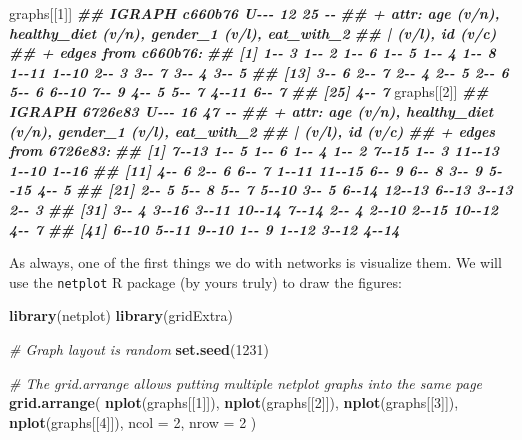 \documentclass[
]{book}
\newenvironment{Shaded}{\begin{snugshade}}{\end{snugshade}}
\newcommand{\AttributeTok}[1]{\textcolor[rgb]{0.13,0.29,0.53}{#1}}
\newcommand{\CommentTok}[1]{\textcolor[rgb]{0.56,0.35,0.01}{\textit{#1}}}
\newcommand{\DecValTok}[1]{\textcolor[rgb]{0.00,0.00,0.81}{#1}}
\newcommand{\DocumentationTok}[1]{\textcolor[rgb]{0.56,0.35,0.01}{\textbf{\textit{#1}}}}
\newcommand{\FunctionTok}[1]{\textcolor[rgb]{0.13,0.29,0.53}{\textbf{#1}}}
\newcommand{\NormalTok}[1]{#1}
\begin{document}
\begin{Shaded}
\begin{Highlighting}[]
\NormalTok{graphs[[}\DecValTok{1}\NormalTok{]]}
\DocumentationTok{\#\# IGRAPH c660b76 U{-}{-}{-} 12 25 {-}{-} }
\DocumentationTok{\#\# + attr: age (v/n), healthy\_diet (v/n), gender\_1 (v/l), eat\_with\_2}
\DocumentationTok{\#\# | (v/l), id (v/c)}
\DocumentationTok{\#\# + edges from c660b76:}
\DocumentationTok{\#\#  [1] 1{-}{-} 3 1{-}{-} 2 1{-}{-} 6 1{-}{-} 5 1{-}{-} 4 1{-}{-} 8 1{-}{-}11 1{-}{-}10 2{-}{-} 3 3{-}{-} 7 3{-}{-} 4 3{-}{-} 5}
\DocumentationTok{\#\# [13] 3{-}{-} 6 2{-}{-} 7 2{-}{-} 4 2{-}{-} 5 2{-}{-} 6 5{-}{-} 6 6{-}{-}10 7{-}{-} 9 4{-}{-} 5 5{-}{-} 7 4{-}{-}11 6{-}{-} 7}
\DocumentationTok{\#\# [25] 4{-}{-} 7}
\NormalTok{graphs[[}\DecValTok{2}\NormalTok{]]}
\DocumentationTok{\#\# IGRAPH 6726e83 U{-}{-}{-} 16 47 {-}{-} }
\DocumentationTok{\#\# + attr: age (v/n), healthy\_diet (v/n), gender\_1 (v/l), eat\_with\_2}
\DocumentationTok{\#\# | (v/l), id (v/c)}
\DocumentationTok{\#\# + edges from 6726e83:}
\DocumentationTok{\#\#  [1]  7{-}{-}13  1{-}{-} 5  1{-}{-} 6  1{-}{-} 4  1{-}{-} 2  7{-}{-}15  1{-}{-} 3 11{-}{-}13  1{-}{-}10  1{-}{-}16}
\DocumentationTok{\#\# [11]  4{-}{-} 6  2{-}{-} 6  6{-}{-} 7  1{-}{-}11 11{-}{-}15  6{-}{-} 9  6{-}{-} 8  3{-}{-} 9  5{-}{-}15  4{-}{-} 5}
\DocumentationTok{\#\# [21]  2{-}{-} 5  5{-}{-} 8  5{-}{-} 7  5{-}{-}10  3{-}{-} 5  6{-}{-}14 12{-}{-}13  6{-}{-}13  3{-}{-}13  2{-}{-} 3}
\DocumentationTok{\#\# [31]  3{-}{-} 4  3{-}{-}16  3{-}{-}11 10{-}{-}14  7{-}{-}14  2{-}{-} 4  2{-}{-}10  2{-}{-}15 10{-}{-}12  4{-}{-} 7}
\DocumentationTok{\#\# [41]  6{-}{-}10  5{-}{-}11  9{-}{-}10  1{-}{-} 9  1{-}{-}12  3{-}{-}12  4{-}{-}14}
\end{Highlighting}
\end{Shaded}

As always, one of the first things we do with networks is visualize them. We will use the \texttt{netplot} R package (by yours truly) to draw the figures:

\begin{Shaded}
\begin{Highlighting}[]
\FunctionTok{library}\NormalTok{(netplot)}
\FunctionTok{library}\NormalTok{(gridExtra)}

\CommentTok{\# Graph layout is random}
\FunctionTok{set.seed}\NormalTok{(}\DecValTok{1231}\NormalTok{)}

\CommentTok{\# The grid.arrange allows putting multiple netplot graphs into the same page}
\FunctionTok{grid.arrange}\NormalTok{(}
  \FunctionTok{nplot}\NormalTok{(graphs[[}\DecValTok{1}\NormalTok{]]),}
  \FunctionTok{nplot}\NormalTok{(graphs[[}\DecValTok{2}\NormalTok{]]),}
  \FunctionTok{nplot}\NormalTok{(graphs[[}\DecValTok{3}\NormalTok{]]),}
  \FunctionTok{nplot}\NormalTok{(graphs[[}\DecValTok{4}\NormalTok{]]),}
  \AttributeTok{ncol =} \DecValTok{2}\NormalTok{, }\AttributeTok{nrow =} \DecValTok{2}
\NormalTok{)}
\end{Highlighting}
\end{Shaded}
\end{document}
